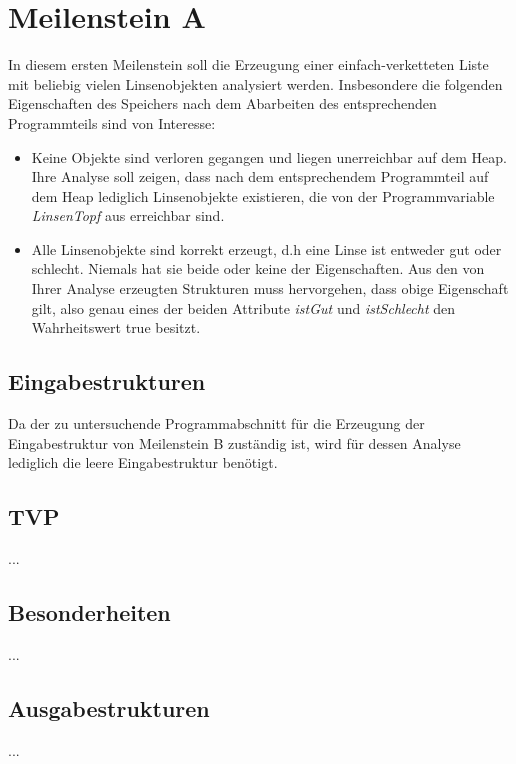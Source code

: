 \section{Meilenstein A}
In diesem ersten Meilenstein soll die Erzeugung einer einfach-verketteten Liste mit beliebig vielen Linsenobjekten analysiert werden. Insbesondere die folgenden Eigenschaften des Speichers nach dem Abarbeiten des entsprechenden Programmteils sind von Interesse:
\begin{itemize}
	\item Keine Objekte sind verloren gegangen und liegen unerreichbar auf dem Heap. Ihre Analyse soll zeigen, dass nach dem entsprechendem Programmteil auf dem Heap lediglich Linsenobjekte existieren, die von der Programmvariable \emph{LinsenTopf} aus erreichbar sind.
	\item Alle Linsenobjekte sind korrekt erzeugt, d.h eine Linse ist entweder gut oder schlecht. Niemals hat sie beide oder keine der Eigenschaften. Aus den von Ihrer Analyse erzeugten Strukturen muss hervorgehen, dass obige Eigenschaft gilt, also genau eines der beiden Attribute \emph{istGut} und \emph{istSchlecht} den Wahrheitswert true besitzt.
\end{itemize}


\subsection{Eingabestrukturen}
Da der zu untersuchende Programmabschnitt für die Erzeugung der Eingabestruktur von Meilenstein B zuständig ist, wird für dessen Analyse lediglich die leere Eingabestruktur benötigt. 


\subsection{TVP}
...


\subsection{Besonderheiten}
...


\subsection{Ausgabestrukturen}
...